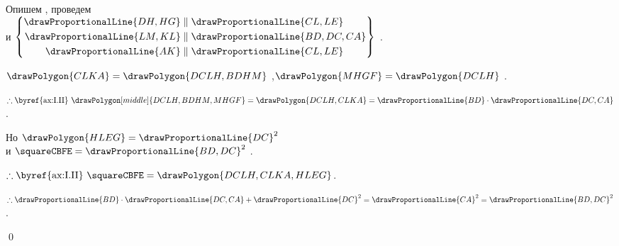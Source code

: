 \documentclass[letters,booklanguage=russian]{byrnebook}
\begin{document}
\begin{center}
Опишем  , проведем \\
и $\left\{
\begin{aligned}
	\drawProportionalLine{DH,HG} & \parallel \drawProportionalLine{CL,LE} \\
	\drawProportionalLine{LM,KL} & \parallel \drawProportionalLine{BD,DC,CA} \\
	\drawProportionalLine{AK} & \parallel \drawProportionalLine{CL,LE} \\
\end{aligned}
\right\}$ .

$\drawPolygon{CLKA} = \drawPolygon{DCLH,BDHM}$ ,$\drawPolygon{MHGF} = \drawPolygon{DCLH}$ .

$\therefore \mbox{\byref{ax:I.II} } \drawPolygon[middle]{DCLH,BDHM,MHGF} = \drawPolygon{DCLH,CLKA} = \drawProportionalLine{BD} \cdot \drawProportionalLine{DC,CA}$.

Но $\drawPolygon{HLEG} = \drawProportionalLine{DC}^2$ \\
и $\squareCBFE = \drawProportionalLine{BD,DC}^2$ \byref{\constref}.

$\therefore \mbox{\byref{ax:I.II} } \squareCBFE = \drawPolygon{DCLH,CLKA,HLEG}$.

$\therefore \drawProportionalLine{BD} \cdot \drawProportionalLine{DC,CA} + \drawProportionalLine{DC}^2 = \drawProportionalLine{CA}^2 = \drawProportionalLine{BD,DC}^2$.
\end{center}

\qed
\end{document}
